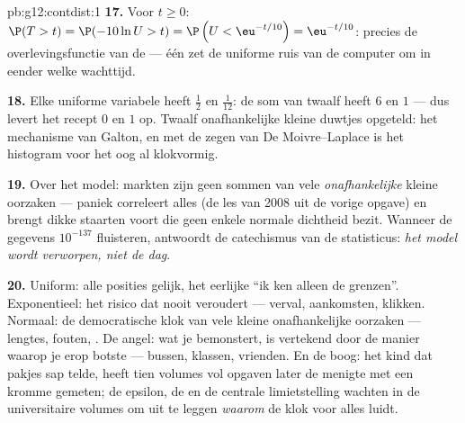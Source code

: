 \begin{solution}{pb:g12:contdist:1}
\textbf{17.} Voor $t \geq 0$:
$\P(T > t) = \P(-10\ln U > t) = \P\left(U < \eu^{-t/10}\right) =
\eu^{-t/10}$: precies de overlevingsfunctie van de  ---
één  zet de uniforme ruis van de computer om in eender welke
wachttijd.

\textbf{18.} Elke uniforme variabele heeft  $\frac12$ en 
$\frac{1}{12}$: de som van twaalf heeft  $6$ en  $1$ ---
dus levert het recept  $0$ en  $1$ op. Twaalf
onafhankelijke kleine duwtjes opgeteld: het mechanisme van Galton, en met de
zegen van De Moivre--Laplace is het histogram voor het oog al klokvormig.

\textbf{19.} Over het model: markten zijn geen sommen van vele
\emph{onafhankelijke} kleine oorzaken --- paniek correleert alles (de les van
2008 uit de vorige opgave) en brengt dikke staarten voort die geen enkele
normale dichtheid bezit. Wanneer de gegevens $10^{-137}$ fluisteren, antwoordt
de catechismus van de statisticus: \emph{het model wordt verworpen, niet de
dag}.

\textbf{20.} Uniform: alle posities gelijk, het eerlijke ``ik ken alleen de
grenzen''. Exponentieel: het risico dat nooit veroudert --- verval,
aankomsten, klikken. Normaal: de democratische klok van vele kleine
onafhankelijke oorzaken --- lengtes, fouten, . De angel: wat je
bemonstert, is vertekend door de manier waarop je erop botste --- bussen,
klassen, vrienden. En de boog: het kind dat pakjes sap telde, heeft tien
volumes vol opgaven later de menigte met een kromme gemeten; de epsilon, de
 en de centrale limietstelling wachten in de universitaire volumes om
uit te leggen \emph{waarom} de klok voor alles luidt.
\end{solution}

